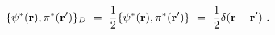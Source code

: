 \begin{equation}
\{\psi ^{\ast }({\bf r}),\pi ^{\ast }({\bf r^{\prime }})\}_{D}\ =\ {\frac{1}{%
2}}\{\psi ^{\ast }({\bf r}),\pi ^{\ast }({\bf r^{\prime }})\}\ =\ {\frac{1}{2%
}}\delta ({\bf r}-{\bf r^{\prime }})\ .  \label{DB4}
\end{equation}%
